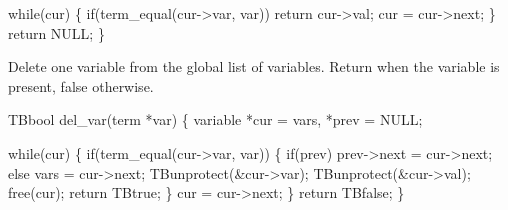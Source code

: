   while(cur) \{
    if(term_equal(cur->var, var))
      return cur->val;
    cur = cur->next;
  \}
  return NULL;
\}
\nwendcode{}\nwdocspar


Delete one variable from the global list of variables.
Return when the variable is present, false otherwise.

\nwenddocs{}\endmoddef\let\nwnotused=\nwoutput{}
TBbool del_var(term *var)
\{
  variable *cur = vars, *prev = NULL;

  while(cur) \{
    if(term_equal(cur->var, var)) \{
      if(prev)
        prev->next = cur->next;
      else
        vars = cur->next;
      TBunprotect(&cur->var);
      TBunprotect(&cur->val);
      free(cur);
      return TBtrue;
    \}
    cur = cur->next;
  \}
  return TBfalse;
\}
\nwendcode{}

